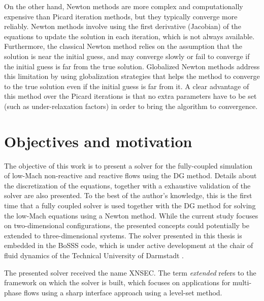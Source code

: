 On the other hand, Newton methods are more complex and computationally expensive than Picard iteration methods, but they typically converge more reliably. Newton methods involve using the first derivative (Jacobian) of the equations to update the solution in each iteration, which is not always available. Furthermore, the classical Newton method relies on the assumption that the solution is near the initial guess, and may converge slowly or fail to converge if the initial guess is far from the true solution. Globalized Newton methods address this limitation by using globalization strategies that helps the method to converge to the true solution even if the initial guess is far from it. A clear advantage of this method over the Picard iterations is that no extra parameters have to be set (such as under-relaxation factors) in order to bring the algorithm to convergence. 
 
\section{Objectives and motivation}
The objective of this work is to present a solver for the fully-coupled simulation of low-Mach non-reactive and reactive flows using the \gls{DG} method. Details about the discretization of the equations, together with a exhaustive validation of the solver are also presented. To the best of the author's knowledge, this is the first time that a fully coupled solver is used together with the DG method for solving the low-Mach equations using a Newton method. While the current study focuses on two-dimensional configurations, the presented concepts could potentially be extended to three-dimensional systems. The solver presented in this thesis is embedded in the \gls{BoSSS} code, which is under active development at the chair of fluid dynamics of the Technical University of Darmstadt \footnotemark.%


The presented solver received the name  \gls{XNSEC}. The term \textit{extended} refers to the framework on which the solver is built, which focuses on applications for multi-phase flows using a sharp interface approach using a level-set method. 

